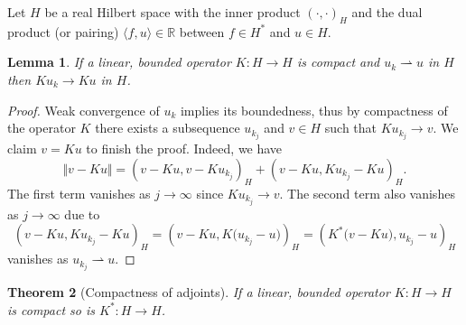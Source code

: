 \documentclass[12pt,oneside,reqno]{amsart}
\newcommand{\R}{\mathbb{R}}
\theoremstyle{plain}
\newtheorem{thm}{Theorem}[section]
\newtheorem{lem}[thm]{Lemma}
\theoremstyle{remark}
\begin{document}
Let $H$ be a real Hilbert space with the inner product $(\cdot, \cdot)_H$ and the dual product (or pairing) $\langle f, u\rangle \in \R$ between $f\in H^*$ and $u\in H$.

\begin{lem} If a linear, bounded operator $K:H\to H$ is compact and $u_k\rightharpoonup u$ in $H$ then $Ku_k\to Ku$ in $H$.
\end{lem}

\begin{proof} Weak convergence of $u_k$ implies its boundedness, thus by compactness of the operator $K$ there exists a subsequence $u_{k_j}$ and $v\in H$ such that $Ku_{k_j}\to v$. We claim $v = Ku$ to finish the proof. Indeed, we have
\begin{equation*}
    \Vert v - Ku\Vert = \left(v-Ku, v-Ku_{k_j}\right)_H + \left(v-Ku, Ku_{k_j} - Ku\right)_H.
\end{equation*}
The first term vanishes as $j\to \infty$ since $Ku_{k_j}\to v$. The second term also vanishes as $j\to \infty$ due to
\begin{equation*}
    \left(v-Ku, Ku_{k_j} - Ku\right)_H = \left(v-Ku, K\big(u_{k_j} - u\big)\right)_H = \left(K^*\big(v-Ku\big), u_{k_j} - u\right)_H
\end{equation*}
vanishes as $u_{k_j}\rightharpoonup u$.
\end{proof}

\begin{thm}[Compactness of adjoints] If a linear, bounded operator $K:H\to H$ is compact so is $K^*:H\to H$.
\end{thm}


{}

\end{document}
